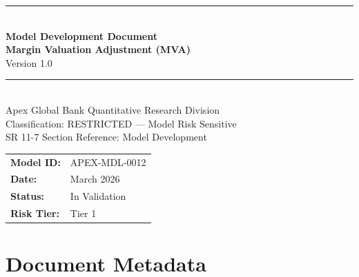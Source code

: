 \documentclass[11pt,a4paper]{article}
\begin{document}

\begin{titlepage}
  \begin{center}
    \vspace*{2cm}
    {\color{apexblue}\rule{\linewidth}{2pt}}\\[0.5cm]
    {\Huge\bfseries\color{apexblue} Model Development Document}\\[0.4cm]
    {\LARGE\bfseries Margin Valuation Adjustment (MVA)}\\[0.3cm]
    {\Large Version 1.0}\\[0.5cm]
    {\color{apexblue}\rule{\linewidth}{2pt}}\\[1cm]
    {\large Apex Global Bank \textbar{} Quantitative Research Division}\\[0.3cm]
    {\large\textcolor{apexred}{Classification: RESTRICTED --- Model Risk Sensitive}}\\[0.3cm]
    {\large SR 11-7 Section Reference: Model Development}\\[2cm]
    \begin{tabular}{ll}
      \textbf{Model ID:}   & APEX-MDL-0012 \\[4pt]
      \textbf{Date:}       & March 2026 \\[4pt]
      \textbf{Status:}     & In Validation \\[4pt]
      \textbf{Risk Tier:}  & Tier 1 \\
    \end{tabular}
  \end{center}
\end{titlepage}

\tableofcontents
\newpage

\section{Document Metadata}
\end{document}
